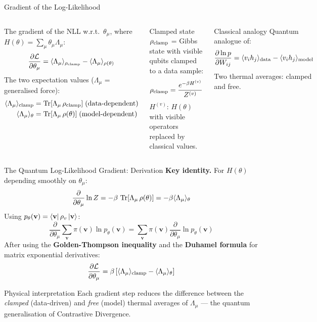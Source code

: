 \documentclass[aspectratio=169,10pt]{beamer}
\begin{document}
\begin{frame}{Gradient of the Log-Likelihood}
  \begin{columns}[T]
      The gradient of the NLL w.r.t.\ $\theta_\mu$, where
      $H(\theta)=\sum_\mu\theta_\mu\Lambda_\mu$:
      \[
        \frac{\partial\mathcal{L}}{\partial\theta_\mu}
        = \langle\Lambda_\mu\rangle_{\rho_{\rm clamp}}
          - \langle\Lambda_\mu\rangle_{\rho(\theta)}
      \]
      The two expectation values ($\Lambda_\mu$ = generalised force):
      \begin{align*}
        \langle\Lambda_\mu\rangle_{\rm clamp}
        &= \Tr[\Lambda_\mu\,\rho_{\rm clamp}]
           \;\text{(data-dependent)}\\
        \langle\Lambda_\mu\rangle_\theta
        &= \Tr[\Lambda_\mu\,\rho(\theta)]
           \;\text{(model-dependent)}
      \end{align*}
      \begin{block}{Clamped state}
        $\rho_{\rm clamp}$ = Gibbs state with visible qubits
        clamped to a data sample:
        \[
          \rho_{\rm clamp}
          = \frac{e^{-\beta H^{(v)}}}{Z^{(v)}}
        \]
        $H^{(v)}$: $H(\theta)$ with visible operators
        replaced by classical values.
      \end{block}
      \vspace{0.1cm}
      \begin{alertblock}{Classical analogy}
        Quantum analogue of:
        \[
          \frac{\partial\ln p}{\partial W_{ij}}
          = \langle v_ih_j\rangle_{\rm data}
          - \langle v_ih_j\rangle_{\rm model}
        \]
        Two thermal averages: clamped and free.
      \end{alertblock}
  \end{columns}
\end{frame}

\begin{frame}{The Quantum Log-Likelihood Gradient: Derivation}
  \textbf{Key identity.} For $H(\theta)$ depending smoothly on $\theta_\mu$:
  \[
    \frac{\partial}{\partial\theta_\mu}\ln Z
    = -\beta\,\Tr\!\left[\Lambda_\mu\,\rho(\theta)\right]
    = -\beta\langle\Lambda_\mu\rangle_\theta
  \]
  Using $p_\theta(\mathbf{v}) = \bra{\mathbf{v}}\rho_v\ket{\mathbf{v}}$:
  \[
    \frac{\partial}{\partial\theta_\mu}
    \sum_\mathbf{v}\pi(\mathbf{v})\ln p_\theta(\mathbf{v})
    = \sum_\mathbf{v}\pi(\mathbf{v})
      \frac{\partial}{\partial\theta_\mu}\ln p_\theta(\mathbf{v})
  \]
  After using the \textbf{Golden-Thompson inequality} and the
  \textbf{Duhamel formula} for matrix exponential derivatives:
  \[
    \frac{\partial \mathcal{L}}{\partial\theta_\mu}
    = \beta\left[
        \langle\Lambda_\mu\rangle_{\rm clamp}
        - \langle\Lambda_\mu\rangle_\theta
      \right]
  \]
  \begin{alertblock}{Physical interpretation}
    Each gradient step reduces the difference between the
    \emph{clamped} (data-driven) and \emph{free} (model)
    thermal averages of $\Lambda_\mu$ — the quantum
    generalisation of Contrastive Divergence.
  \end{alertblock}
\end{frame}
\end{document}

